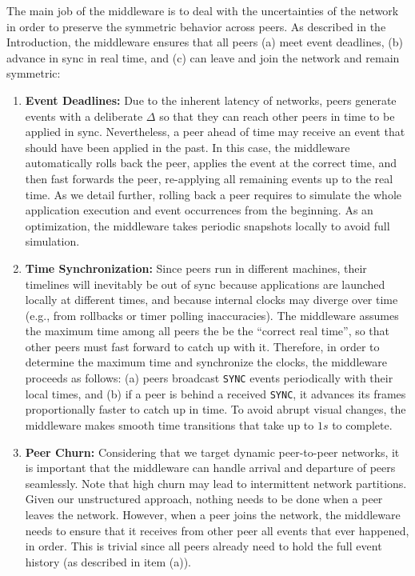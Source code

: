 \documentclass[12pt]{article}
\newcommand{\code}[1]  {\texttt{\small{#1}}}
\begin{document}
The main job of the middleware is to deal with the uncertainties of the
network in order to preserve the symmetric behavior across peers.
As described in the Introduction, the middleware ensures that all peers
    (a) meet event deadlines,
    (b) advance in sync in real time, and
    (c) can leave and join the network and remain symmetric:
%
\begin{enumerate}
\item \textbf{Event Deadlines:}
Due to the inherent latency of networks, peers generate events with a
deliberate $\Delta$ so that they can reach other peers in time to be applied in
sync.
Nevertheless, a peer ahead of time may receive an event that should have been
applied in the past. %
In this case, the middleware automatically rolls back the peer, applies the
event at the correct time, and then fast forwards the peer, re-applying all
remaining events up to the real time.
As we detail further, rolling back a peer requires to simulate the whole
application execution and event occurrences from the beginning.
As an optimization, the middleware takes periodic snapshots locally to avoid
full simulation.
%
\item \textbf{Time Synchronization:}
Since peers run in different machines, their timelines will inevitably be out
of sync because applications are launched locally at different times, and
because internal clocks may diverge over time (e.g., from rollbacks or timer
polling inaccuracies).
The middleware assumes the maximum time among all peers the be the
``correct real time'', so that other peers must fast forward to catch up with
it.
Therefore, in order to determine the maximum time and synchronize the clocks,
the middleware proceeds as follows:
    (a) peers broadcast \code{SYNC} events periodically with their local
        times, and
    (b) if a peer is behind a received \code{SYNC}, it advances its frames
        proportionally faster to catch up in time.
%
To avoid abrupt visual changes, the middleware makes smooth time transitions
that take up to $1s$ to complete.
%
\item \textbf{Peer Churn:}
Considering that we target dynamic peer-to-peer networks, it is important that
the middleware can handle arrival and departure of peers seamlessly.
Note that high churn may lead to intermittent network partitions.
Given our unstructured approach, nothing needs to be done when a peer leaves
the network.
However, when a peer joins the network, the middleware needs to ensure that it
receives from other peer all events that ever happened, in order.
This is trivial since all peers already need to hold the full event history (as
described in item (a)).
\end{enumerate}
\end{document}

